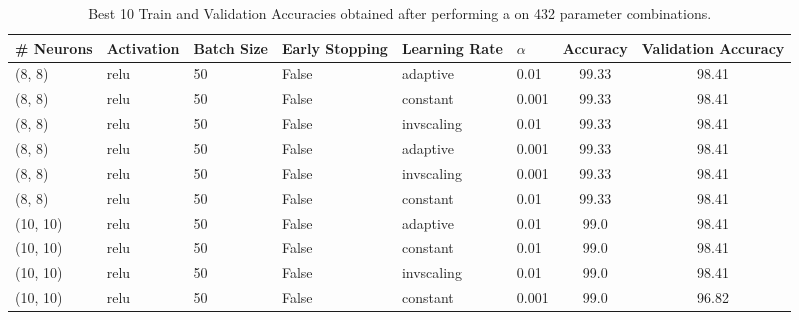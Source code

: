 \def\arraystretch{1.25}
\begin{table}[H]
\centering
{\small
\begin{tabular}{l l l l l l c c}
\hline
\hline
\textbf{\# Neurons} & \textbf{Activation} & \textbf{Batch Size} & \textbf{Early Stopping} & \textbf{Learning Rate} & \textbf{$\alpha$} & \textbf{Accuracy} & \textbf{Validation Accuracy} \\
\hline
\hline
(8, 8) & relu & 50 & False & adaptive & 0.01 & 99.33 & 98.41  \\
(8, 8) & relu & 50 & False & constant & 0.001 & 99.33 & 98.41  \\
(8, 8) & relu & 50 & False & invscaling & 0.01 & 99.33 & 98.41  \\
(8, 8) & relu & 50 & False & adaptive & 0.001 & 99.33 & 98.41  \\
(8, 8) & relu & 50 & False & invscaling & 0.001 & 99.33 & 98.41  \\
(8, 8) & relu & 50 & False & constant & 0.01 & 99.33 & 98.41  \\
(10, 10) & relu & 50 & False & adaptive & 0.01 & 99.0 & 98.41  \\
(10, 10) & relu & 50 & False & constant & 0.01 & 99.0 & 98.41  \\
(10, 10) & relu & 50 & False & invscaling & 0.01 & 99.0 & 98.41  \\
(10, 10) & relu & 50 & False & constant & 0.001 & 99.0 & 96.82  \\
\hline
\end{tabular}
\caption{Best 10 Train and Validation Accuracies obtained after performing a  on 432 parameter combinations.}
}
\end{table}